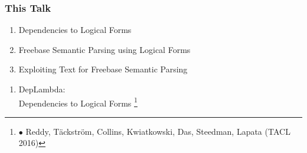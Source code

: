 \documentclass[mathserif,12pt]{beamer}
\newcommand\blfootnote[1]{%
  \begingroup
  \renewcommand\thefootnote{}\footnote{#1}%
  \addtocounter{footnote}{-1}%
  \endgroup
}
\begin{document}
\begin{frame}
\frametitle{This Talk}
\large 
\begin{enumerate}
 \item Dependencies to Logical Forms
 
 \vspace{2em}
 \item Freebase Semantic Parsing using Logical Forms
 
 \vspace{2em}
 \item Exploiting Text for Freebase Semantic Parsing
\end{enumerate}

\end{frame}

\begin{frame}
\Large
\centering
\vspace{1.5em}
\begin{enumerate}
 \item DepLambda: \\
 Dependencies to Logical Forms \blfootnote{\color{blue} $\bullet$  Reddy, T\"ackstr\"om, Collins, Kwiatkowski, Das, Steedman, Lapata (TACL 2016)}
\end{enumerate}
\end{frame}
\end{document}
